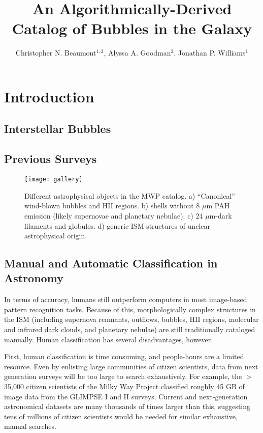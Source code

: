 \documentclass[preprint]{aastex}
\begin{document}
\title{An Algorithmically-Derived Catalog of Bubbles in the Galaxy}
\author{Christopher N. Beaumont$^{1,2}$, Alyssa A. Goodman$^2$, Jonathan P. Williams$^1$}

\section{Introduction}
\label{sec:intro}

\subsection{Interstellar Bubbles}
\label{sec:bubbles}

\subsection{Previous Surveys}
\label{sec:previous_surveys}

\begin{figure*}
\texttt{[image: gallery]}
\caption{Different astrophysical objects in the MWP catalog. a) ``Canonical'' wind-blown bubbles and HII regions. b) shells
without 8 $\mu$m PAH emission (likely supernovae and planetary nebulae). c) 24 $\mu$m-dark filaments and globules. d) generic
ISM structures of unclear astrophysical origin.}
\label{fig:gallery}
\end{figure*}

\subsection{Manual and Automatic Classification in Astronomy}
\label{sec:benefits}



In terms of accuracy, humans still outperform computers in most image-based pattern recognition tasks. Because of this, morphologically complex
structures in the ISM (including supernova remnants, outflows, bubbles, HII regions, molecular and infrared dark clouds, and planetary nebulae) are still
traditionally cataloged manually. Human classification has several disadvantages, however.

First, human classification is time consuming, and people-hours are a limited resource. Even by enlisting large communities of citizen scientists, data from next generation surveys will be too large to search exhaustively. For example, the $>$ 35,000 citizen scientists of the Milky Way Project classified roughly 45 GB of image data from the GLIMPSE I and II surveys. Current and next-generation astronomical datasets are many thousands of times larger than this, suggesting tens of millions of citizen scientists would be needed for similar exhaustive, manual searches.
\end{document}
